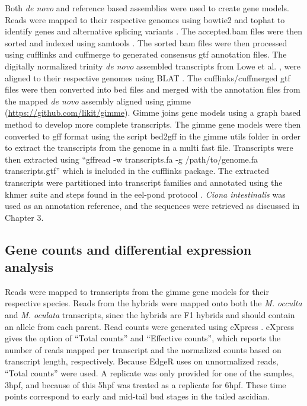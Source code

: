 Both \textit{de novo} and reference based assemblies were used to create gene models. Reads were mapped to their respective genomes using bowtie2 and tophat to identify genes and alternative splicing variants \cite{langmead_fast_2012,trapnell_differential_2012}. The accepted.bam files were then sorted and indexed using samtools \cite{li_sequence_2009}. The sorted bam files were then processed using cufflinks and cuffmerge to generated consensus gtf annotation files. The digitally normalized trinity \textit{de novo} assembled transcripts from Lowe et al. \cite{lowe_evaluating_2014}, were aligned to their respective genomes using BLAT \cite{haas_novo_2013}. The cufflinks/cuffmerged gtf files were then converted into bed files and merged with the annotation files from the mapped \textit{de novo} assembly aligned using gimme (\url{https://github.com/likit/gimme}). Gimme joins gene models using a graph based method to develop more complete transcripts. The gimme gene models were then converted to gff format using the script bed2gff in the gimme utils folder in order to extract the transcripts from the genome in a multi fast file. Transcripts were then extracted using ``gffread -w transcripts.fa -g /path/to/genome.fa transcripts.gtf'' which is included in the cufflinks package. The extracted transcripts were partitioned into transcript families and annotated using the khmer suite and steps found in the eel-pond protocol \cite{}. \textit{Ciona intestinalis} was used as an annotation reference, and the sequences were retrieved as discussed in Chapter 3. 

\subsection{Gene counts and differential expression analysis}
Reads were mapped to transcripts from the gimme gene models for their respective species. Reads from the hybrids were mapped onto both the \textit{M. occulta} and \textit{M. oculata} transcripts, since the hybrids are F1 hybrids and should contain an allele from each parent. Read counts were generated using eXpress \cite{roberts_streaming_2013}. eXpress gives the option of ``Total counts'' and ``Effective counts'', which reports the number of reads mapped per transcript and the normalized counts based on transcript length, respectively. Because EdgeR uses on unnormalized reads, ``Total counts'' were used. A replicate was only provided for one of the samples, 3hpf, and because of this 5hpf was treated as a replicate for 6hpf. These time points correspond to early and mid-tail bud stages in the tailed ascidian. 

